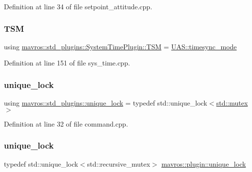 Definition at line 34 of file setpoint\+\_\+attitude.\+cpp.

\mbox{\label{group__plugin_ga57fc98429d89947298f623d8fbb37364}} 
\subsubsection{\texorpdfstring{TSM}{TSM}}
{\footnotesize\ttfamily using \mbox{\hyperlink{group__mavutils_gac7f53712a7627f397d0eb145c2a16cf7}{mavros\+::std\+\_\+plugins\+::\+System\+Time\+Plugin\+::\+T\+SM}} =  \mbox{\hyperlink{group__mavutils_gac7f53712a7627f397d0eb145c2a16cf7}{U\+A\+S\+::timesync\+\_\+mode}}}



Definition at line 151 of file sys\+\_\+time.\+cpp.

\mbox{\label{group__plugin_ga9de76c8b4514d14b9b92bdbc83572808}} 
\subsubsection{\texorpdfstring{unique\_lock}{unique\_lock}\hspace{0.1cm}{\footnotesize\ttfamily [1/2]}}
{\footnotesize\ttfamily using \mbox{\hyperlink{group__plugin_ga9de76c8b4514d14b9b92bdbc83572808}{mavros\+::std\+\_\+plugins\+::unique\+\_\+lock}} = typedef std\+::unique\+\_\+lock$<$\mbox{\hyperlink{data_8c_a4acff8232e4aec9cd5c6dc200ac55ef3}{std\+::mutex}}$>$}



Definition at line 32 of file command.\+cpp.

\mbox{\label{group__plugin_gaf461fd7bb3ba3755cdbd6129141f8cca}} 
\subsubsection{\texorpdfstring{unique\_lock}{unique\_lock}\hspace{0.1cm}{\footnotesize\ttfamily [2/2]}}
{\footnotesize\ttfamily typedef std\+::unique\+\_\+lock$<$std\+::recursive\+\_\+mutex$>$ \mbox{\hyperlink{group__plugin_gaf461fd7bb3ba3755cdbd6129141f8cca}{mavros\+::plugin\+::unique\+\_\+lock}}}



